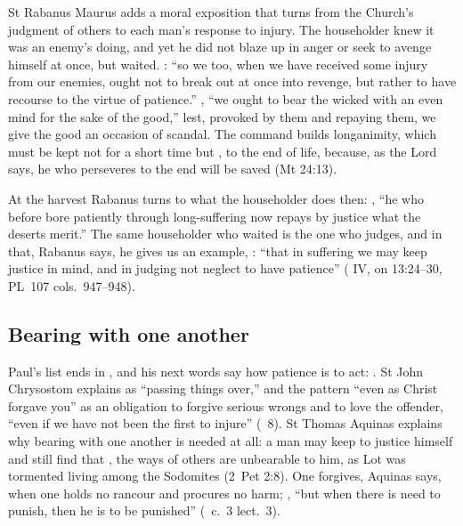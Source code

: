 St Rabanus Maurus adds a moral exposition that turns from the Church's
judgment of others to each man's response to injury. The householder knew it
was an enemy's doing, and yet he did not blaze up in anger or seek to avenge
himself at once, but waited. : ``so we too,
when we have received some injury from our enemies, ought not to break out at
once into revenge, but rather to have recourse to the virtue of patience.''
, ``we ought to
bear the wicked with an even mind for the sake of the good,'' lest, provoked
by them and repaying them, we give the good an occasion of scandal. The
command  builds longanimity, which must be kept not for a short
time but , to the end of life, because, as the
Lord says, he who perseveres to the end will be saved (Mt 24:13).

At the harvest Rabanus turns to what the householder does then:
, ``he who before bore patiently through
long-suffering now repays by justice what the deserts merit.'' The same
householder who waited is the one who judges, and in that, Rabanus says, he
gives us an example, : ``that in suffering we may keep
justice in mind, and in judging not neglect to have patience'' ( IV, on 13:24--30, PL~107 cols.~947--948).

\subsection{Bearing with one another}
\label{sec:patience-epistle}

Paul's list ends in , and his next words say how patience
is to act:
. St John
Chrysostom explains  as ``passing things over,'' and the
pattern ``even as Christ forgave you'' as an obligation to forgive serious
wrongs and to love the offender, ``even if we have not been the first to
injure'' (\ 8). St Thomas Aquinas explains why bearing
with one another is needed at all: a man may keep to justice himself and still
find that , the ways of others are
unbearable to him, as Lot was tormented living among the Sodomites (2~Pet
2:8). One forgives, Aquinas says, when one holds no rancour and procures no
harm; , ``but
when there is need to punish, then he is to be punished'' (\
c.~3 lect.~3).

